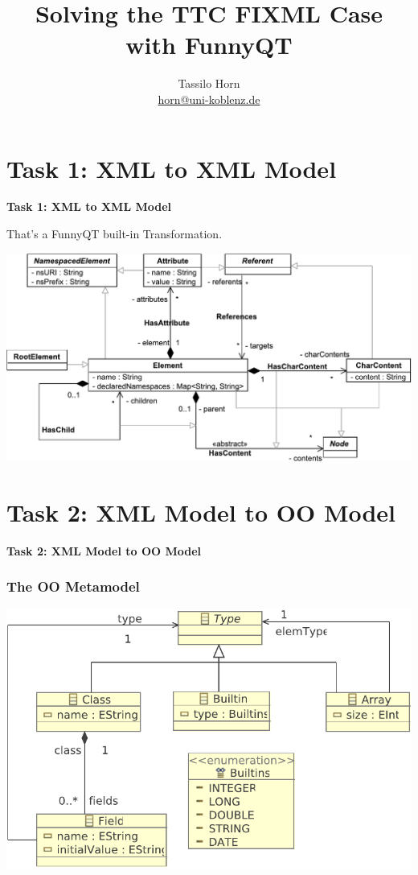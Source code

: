 \documentclass{beamer}
\title{Solving the TTC FIXML Case with FunnyQT}
\author{Tassilo Horn\\
  \href{mailto:horn@uni-koblenz.de}{horn@uni-koblenz.de}}
\begin{document}
\maketitle{}

\section{Task 1: XML to XML Model}

\begin{frame}
  \LARGE
  \begin{center}
    \textbf{Task 1: XML to XML Model}
  \end{center}
\end{frame}

\begin{frame}
  That's a FunnyQT built-in Transformation.
  \begin{center}
    \includegraphics[width=\textwidth]{../doc/xml-schema}
  \end{center}
\end{frame}

\section{Task 2: XML Model to OO Model}

\begin{frame}
  \LARGE
  \begin{center}
    \textbf{Task 2: XML Model to OO Model}
  \end{center}
\end{frame}

\begin{frame}[fragile]
  \frametitle{The OO Metamodel}
  \begin{center}
    \includegraphics[width=.8\textwidth]{../model/oo.pdf}
  \end{center}
\end{frame}
\end{document}
